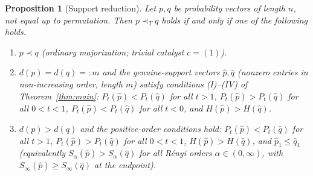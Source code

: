 \documentclass{amsart}
\theoremstyle{plain}
\newtheorem{proposition}{Proposition}
\theoremstyle{definition}
\newcommand{\maj}{\prec}
\newcommand{\trump}{\prec_T}
\begin{document}
\begin{proposition}[Support reduction]\label{prop:supp}
Let $p,q$ be probability vectors of length $n$, not equal up to permutation. Then
$p\trump q$ holds if and only if one of the following holds.
\begin{enumerate}
\item[\textnormal{(a)}] $p\maj q$ (ordinary majorization; trivial catalyst $c=(1)$).
\item[\textnormal{(b)}] $d(p)=d(q)=:m$ and the genuine-support vectors $\hat p,\hat q$
(nonzero entries in non-increasing order, length $m$) satisfy conditions
\textnormal{(I)--(IV)} of Theorem~\ref{thm:main}: $P_t(\hat p)<P_t(\hat q)$ for all
$t>1$, $P_t(\hat p)>P_t(\hat q)$ for all $0<t<1$, $P_t(\hat p)<P_t(\hat q)$ for all
$t<0$, and $H(\hat p)>H(\hat q)$.
\item[\textnormal{(c)}] $d(p)>d(q)$ and the \emph{positive-order} conditions hold:
$P_t(\hat p)<P_t(\hat q)$ for all $t>1$, $P_t(\hat p)>P_t(\hat q)$ for all $0<t<1$,
$H(\hat p)>H(\hat q)$, and $\hat p_1\le\hat q_1$ \textnormal{(}equivalently
$S_\alpha(\hat p)>S_\alpha(\hat q)$ for all R\'enyi orders $\alpha\in(0,\infty)$, with
$S_\infty(\hat p)\ge S_\infty(\hat q)$ at the endpoint\textnormal{)}.
\end{enumerate}
\end{proposition}
\end{document}
